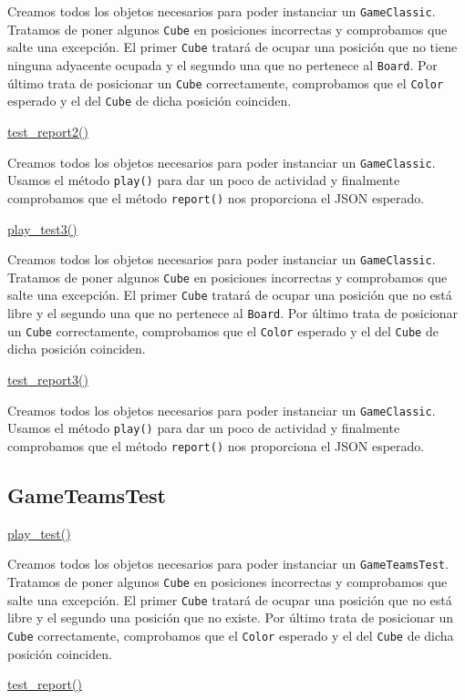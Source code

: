 \documentclass[12pt,a4paper,openright]{book}
\theoremstyle{break}
\begin{document}
Creamos todos los objetos necesarios para poder instanciar un \texttt{GameClassic}. Tratamos de poner algunos \texttt{Cube} en posiciones incorrectas y comprobamos que salte una excepción. El primer \texttt{Cube} tratará de ocupar una posición que no tiene ninguna adyacente ocupada y el segundo una que no pertenece al \texttt{Board}. Por último trata de posicionar un \texttt{Cube} correctamente, comprobamos que el \texttt{Color} esperado y el del \texttt{Cube} de dicha posición coinciden.

\underline{test\_report2()}

Creamos todos los objetos necesarios para poder instanciar un \texttt{GameClassic}. Usamos el método \texttt{play()} para dar un poco de actividad y finalmente comprobamos que el método \texttt{report()} nos proporciona el JSON esperado.

\underline{play\_test3()}

Creamos todos los objetos necesarios para poder instanciar un \texttt{GameClassic}. Tratamos de poner algunos \texttt{Cube} en posiciones incorrectas y comprobamos que salte una excepción. El primer \texttt{Cube} tratará de ocupar una posición que no está libre y el segundo una que no pertenece al \texttt{Board}. Por último trata de posicionar un \texttt{Cube} correctamente, comprobamos que el \texttt{Color} esperado y el del \texttt{Cube} de dicha posición coinciden.

\underline{test\_report3()}

Creamos todos los objetos necesarios para poder instanciar un \texttt{GameClassic}. Usamos el método \texttt{play()} para dar un poco de actividad y finalmente comprobamos que el método \texttt{report()} nos proporciona el JSON esperado.

\subsection{GameTeamsTest}
\underline{play\_test()}

Creamos todos los objetos necesarios para poder instanciar un \texttt{GameTeamsTest}. Tratamos de poner algunos \texttt{Cube} en posiciones incorrectas y comprobamos que salte una excepción. El primer \texttt{Cube} tratará de ocupar una posición que no está libre y el segundo una posición que no existe. Por último trata de posicionar un \texttt{Cube} correctamente, comprobamos que el \texttt{Color} esperado y el del \texttt{Cube} de dicha posición coinciden.

\underline{test\_report()}
\end{document}
